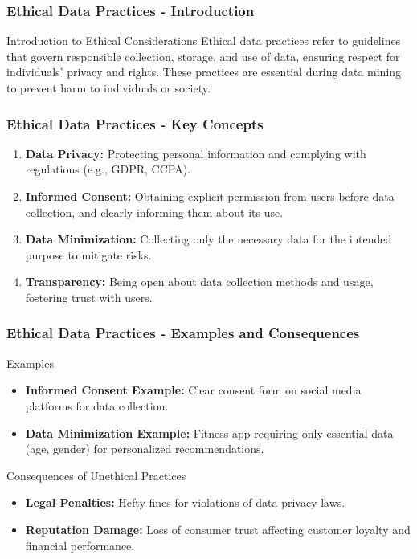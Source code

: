 \documentclass[aspectratio=169]{beamer}
\begin{document}
\begin{frame}[fragile]
    \frametitle{Ethical Data Practices - Introduction}
    \begin{block}{Introduction to Ethical Considerations}
        Ethical data practices refer to guidelines that govern responsible collection, storage, and use of data, ensuring respect for individuals' privacy and rights. These practices are essential during data mining to prevent harm to individuals or society.
    \end{block}
\end{frame}

\begin{frame}[fragile]
    \frametitle{Ethical Data Practices - Key Concepts}
    \begin{enumerate}
        \item \textbf{Data Privacy:} Protecting personal information and complying with regulations (e.g., GDPR, CCPA).
        
        \item \textbf{Informed Consent:} Obtaining explicit permission from users before data collection, and clearly informing them about its use.
        
        \item \textbf{Data Minimization:} Collecting only the necessary data for the intended purpose to mitigate risks.
        
        \item \textbf{Transparency:} Being open about data collection methods and usage, fostering trust with users.
    \end{enumerate}
\end{frame}

\begin{frame}[fragile]
    \frametitle{Ethical Data Practices - Examples and Consequences}
    \begin{block}{Examples}
        \begin{itemize}
            \item \textbf{Informed Consent Example:} Clear consent form on social media platforms for data collection.
            \item \textbf{Data Minimization Example:} Fitness app requiring only essential data (age, gender) for personalized recommendations.
        \end{itemize}
    \end{block}
    
    \begin{block}{Consequences of Unethical Practices}
        \begin{itemize}
            \item \textbf{Legal Penalties:} Hefty fines for violations of data privacy laws.
            \item \textbf{Reputation Damage:} Loss of consumer trust affecting customer loyalty and financial performance.
        \end{itemize}
    \end{block}
\end{frame}
\end{document}
